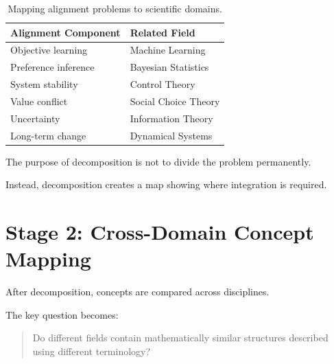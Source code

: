 \documentclass[11pt]{article}
\begin{document}
\begin{table}[h]

\centering

\begin{tabular}{ll}

\toprule

Alignment Component & Related Field \\

\midrule

Objective learning
& Machine Learning
\\

Preference inference
& Bayesian Statistics
\\

System stability
& Control Theory
\\

Value conflict
& Social Choice Theory
\\

Uncertainty
& Information Theory
\\

Long-term change
& Dynamical Systems
\\

\bottomrule

\end{tabular}

\caption{
Mapping alignment problems to scientific domains.
}

\end{table}



The purpose of decomposition is not to divide the problem permanently.


Instead, decomposition creates a map showing where integration is
required.



\section{Stage 2: Cross-Domain Concept Mapping}


After decomposition, concepts are compared across disciplines.


The key question becomes:


\begin{quote}

Do different fields contain mathematically similar structures described
using different terminology?

\end{quote}
\end{document}

